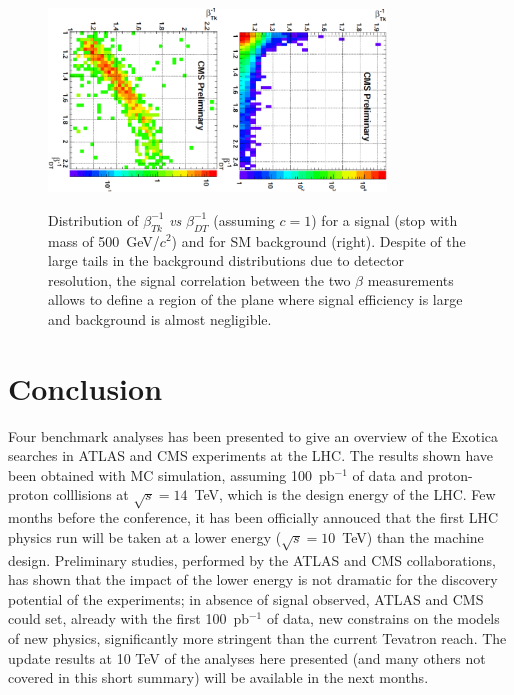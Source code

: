 \documentclass{cimento}
\begin{document}
\begin{figure}[htbp] 
\centering
\includegraphics[angle=90,width=0.4\textwidth]{betaHSCPSig.eps}\includegraphics[angle=90,width=0.4\textwidth]{betaHSCPBkg.eps}  
\caption{Distribution of $\beta_{Tk}^{-1}$ {\it vs} $\beta_{DT}^{-1}$  
(assuming $c=1$) for a signal (stop with mass of 500~GeV/$c^2$) 
and for SM background (right). 
Despite of the large tails in the background distributions due 
to detector resolution, the signal correlation between the two $\beta$ measurements 
allows to define a region of the plane where signal efficiency is 
large and background is almost negligible.}
\label{fig:HSCPSigBkgPlots}
\end{figure}

\section{Conclusion} \label{Conclusion}
Four benchmark analyses has been presented to give an
overview of the Exotica searches in ATLAS and CMS 
experiments at the LHC. The results shown have been obtained with 
MC simulation, assuming 100~pb$^{-1}$ of data and proton-proton colllisions
at $\sqrt{s} = 14$~TeV, which is the design energy of the LHC.
Few months before the conference, it has been officially annouced 
that the first LHC physics run will be taken at a lower energy 
($\sqrt{s} = 10$~TeV) than the machine design. Preliminary 
studies, performed by the ATLAS and CMS collaborations, 
has shown that the impact of the lower energy is not dramatic for the 
discovery potential of the experiments; in absence of signal observed,
ATLAS and CMS could set, already with the first 100~pb$^{-1}$ of data, 
new constrains on the models of new physics,  significantly more stringent 
than the current Tevatron reach. The update results at 10 TeV of the 
analyses here presented (and many others not covered in this short summary) 
will be available in the next months.
\end{document}
